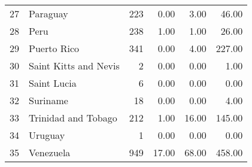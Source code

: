 \begin{table}[ht]
\begin{tabular}{rlrrrr}
  27 & Paraguay & 223 & 0.00 & 3.00 & 46.00 \\ 
  28 & Peru & 238 & 1.00 & 1.00 & 26.00 \\ 
  29 & Puerto Rico & 341 & 0.00 & 4.00 & 227.00 \\ 
  30 & Saint Kitts and Nevis &   2 & 0.00 & 0.00 & 1.00 \\ 
  31 & Saint Lucia &   6 & 0.00 & 0.00 & 0.00 \\ 
  32 & Suriname &  18 & 0.00 & 0.00 & 4.00 \\ 
  33 & Trinidad and Tobago & 212 & 1.00 & 16.00 & 145.00 \\ 
  34 & Uruguay &   1 & 0.00 & 0.00 & 0.00 \\ 
  35 & Venezuela & 949 & 17.00 & 68.00 & 458.00 \\ 
   \hline
\end{tabular}
\end{table}
